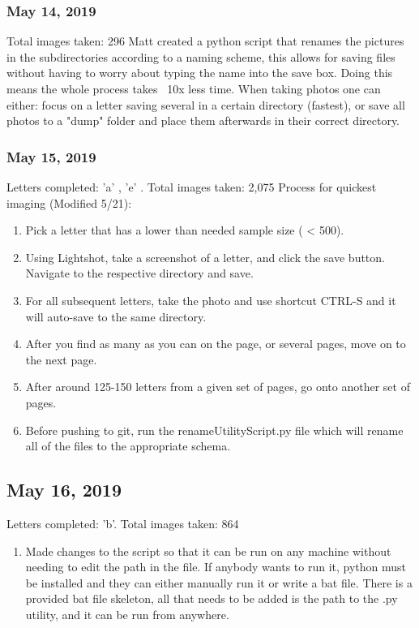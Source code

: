 \documentclass[12pt]{article} %
\begin{document}
\subsubsection{May 14, 2019}
Total images taken: 296\newline
\noindent\makebox[\linewidth]{\rule{15cm}{0.4pt}}
Matt created a python script that renames the pictures in the subdirectories according to a naming scheme, this allows for saving files without having to worry about typing the name into the save box. Doing this means the whole process takes ~10x less time. When taking photos one can either: focus on a letter saving several in a certain directory (fastest), or save all photos to a "dump" folder and place them afterwards in their correct directory.
\subsubsection{May 15, 2019}
Letters completed: 'a' , 'e' . \newline
Total images taken: 2,075 \newline
\noindent\makebox[\linewidth]{\rule{15cm}{0.4pt}}
\large{Process for quickest imaging (Modified 5/21):}
\begin{enumerate}[label = (\roman*)]
\item Pick a letter that has a lower than needed sample size ( < 500).
\item Using Lightshot, take a screenshot of a letter, and click the save button. Navigate to the respective directory and save.
\item For all subsequent letters, take the photo and use shortcut CTRL-S and it will auto-save to the same directory.
\item After you find as many as you can on the page, or several pages, move on to the next page.
\item After around 125-150 letters from a given set of pages, go onto another set of pages.
\item Before pushing to git, run the renameUtilityScript.py file which will rename all of the files to the appropriate schema.
\end{enumerate}

\subsection{May 16, 2019}
Letters completed: 'b'.\newline
Total images taken:  864\newline
\noindent\makebox[\linewidth]{\rule{15cm}{0.4pt}}
\begin{enumerate}[label = (\roman*)]
\item Made changes to the script so that it can be run on any machine without needing to edit the path in the file. If anybody wants to run it, python must be installed and they can either manually run it or write a bat file. There is a provided bat file skeleton, all that needs to be added is the path to the .py utility, and it can be run from anywhere.

\end{enumerate}
\end{document}
